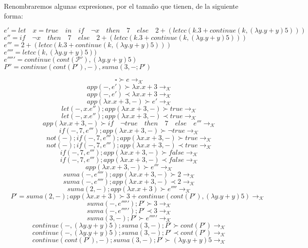 \documentclass[11pt, a4paper]{report}
\begin{document}
\begin{itemize}
Renombraremos algunas expresiones, por el tamaño que  tienen, de la siguiente forma:

$e' = let \quad x=true \quad in \quad if \quad \neg x \quad then \quad 7 \quad else \quad 2+(letcc(k.3+continue(k,(\lambda y.y+y)5)))$\\
$e'' = if \quad \neg x \quad then \quad 7 \quad else \quad 2+(letcc(k.3+continue(k,(\lambda y.y+y)5)))$\\
$e''' = 2+(letcc(k.3+continue(k,(\lambda y.y+y)5)))$\\
$e'''' = letcc(k,(\lambda y.y+y)5))$ \\
$e''''' = continue(cont(\mathcal{P}'),(\lambda y.y+y)5)$\\
$P'' = continue(cont(P'),-),suma(3,-;P')$

 $$\quad \square \succ e \rightarrow_{\mathcal{K}}$$
 $$\quad app(-,e') \succ \lambda x.x+3 \rightarrow_{\mathcal{K}}$$
 $$\quad app(-,e') \prec \lambda x.x+3 \rightarrow_{\mathcal{K}}$$
 $$\quad app(\lambda x.x+3,-) \succ e' \rightarrow_{\mathcal{K}}$$
$$\quad let(-,x.e'');app(\lambda x.x+3,-) \succ true \rightarrow_{\mathcal{K}}$$
$$\quad let(-,x.e'');app(\lambda x.x+3,-) \prec true \rightarrow_{\mathcal{K}}$$
$$\quad app(\lambda x.x+3,-)\succ if \quad \neg true \quad then \quad 7 \quad else \quad e''' \rightarrow_{\mathcal{K}}$$
$$\quad if(-,7,e'''); app(\lambda x.x+3,-) \succ \neg true \rightarrow_{\mathcal{K}}$$
$$\quad not(-);if(-,7,e''');app(\lambda x.x+3,-) \succ true \rightarrow_{\mathcal{K}}$$
$$\quad not(-);if(-,7,e''');app(\lambda x.x+3,-) \prec true \rightarrow_{\mathcal{K}}$$
$$\quad if(-,7,e''');app(\lambda x.x+3,-) \succ false \rightarrow_{\mathcal{K}}$$
$$\quad if(-,7,e''');app(\lambda x.x+3,-) \prec false \rightarrow_{\mathcal{K}}$$
$$\quad app(\lambda x.x+3,-) \succ e''' \rightarrow_{\mathcal{K}}$$
$$\quad suma(-,e'''');app(\lambda x.x+3,-) \succ 2 \rightarrow_{\mathcal{K}}$$
$$\quad suma(-,e'''');app(\lambda x.x+3,-) \prec 2 \rightarrow_{\mathcal{K}}$$
$$\quad suma(2,-);app(\lambda x.x+3) \succ e'''' \rightarrow_{\mathcal{K}}$$
$$\quad P' = suma(2,-);app(\lambda x.x+3) \succ 3+continue(cont(P'),(\lambda y.y+y)5) \rightarrow_{\mathcal{K}}$$
$$\quad suma(-,e''''');P' \succ 3 \rightarrow_{\mathcal{K}}$$
$$\quad suma(-,e''''');P' \prec 3 \rightarrow_{\mathcal{K}}$$
$$\quad suma(3,-);P' \succ e''''' \rightarrow_{\mathcal{K}}$$
$$\quad continue(-,(\lambda y.y+y)5);suma(3,-);P' \succ cont(P') \rightarrow_{\mathcal{K}}$$
$$\quad continue(-,(\lambda y.y+y)5);suma(3,-);P' \prec cont(P') \rightarrow_{\mathcal{K}}$$
$$\quad continue(cont(P'),-);suma(3,-);P' \succ (\lambda y.y+y)5 \rightarrow_{\mathcal{K}}$$

\end{itemize}
\end{document}
